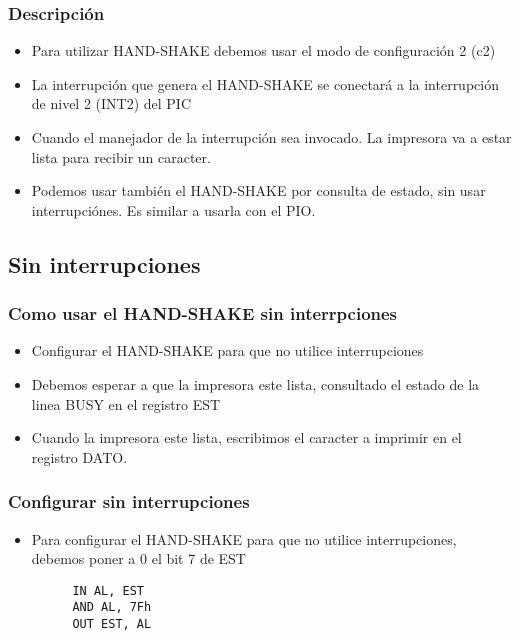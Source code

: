 \documentclass{beamer}
\begin{document}
\begin{frame}
\frametitle{Descripción}
\begin{itemize}
 \item Para utilizar HAND-SHAKE debemos usar el modo de configuración 2 (c2)
 \item La interrupción que genera el HAND-SHAKE se conectará a la interrupción de nivel 2 (INT2) del PIC
 \item Cuando el manejador de la interrupción sea invocado. La impresora va a estar lista para recibir un caracter.
 \item Podemos usar también el HAND-SHAKE por consulta de estado, sin usar interrupciónes. Es similar a usarla con el PIO.
\end{itemize}
\end{frame}

\subsection{Sin interrupciones}
\begin{frame}
\frametitle{Como usar el HAND-SHAKE sin interrpciones}
\begin{itemize}
 \item Configurar el HAND-SHAKE para que no utilice interrupciones
 \item Debemos esperar a que la impresora este lista, consultado el estado de la linea BUSY en el registro EST
 \item Cuando la impresora este lista, escribimos el caracter a imprimir en el registro DATO.
\end{itemize}
\end{frame}

\begin{frame}[fragile]
\frametitle{Configurar sin interrupciones}
\begin{itemize}
 \item Para configurar el HAND-SHAKE para que no utilice interrupciones, debemos poner a 0 el bit 7 de EST
\end{itemize}
\begin{block}{}
 \begin{verbatim}
         IN AL, EST
         AND AL, 7Fh
         OUT EST, AL
 \end{verbatim}
\end{block}
\end{frame}
\end{document}
